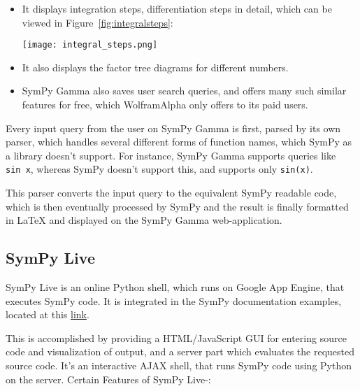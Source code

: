 \begin{itemize}
\item
  It displays integration steps, differentiation steps in detail, which
  can be viewed in Figure~\ref{fig:integralsteps}:\par
\begin{minipage}{\textwidth}
    \centering
    \texttt{[image: integral\_steps.png]}
    \label{fig:integralsteps}
\end{minipage}
\item
  It also displays the factor tree diagrams for different numbers.
\item
  SymPy Gamma also saves user search queries, and offers many such
  similar features for free, which Wolfram\textbar{}Alpha only offers
  to its paid users.
\end{itemize}
Every input query from the user on SymPy Gamma is first, parsed by its
own parser, which handles several different forms of function names,
which SymPy as a library doesn't support. For instance, SymPy Gamma
supports queries like \texttt{sin\ x}, whereas SymPy doesn't support
this, and supports only \verb|sin(x)|.

This parser converts the input query to the equivalent SymPy readable
code, which is then eventually processed by SymPy and the result is
finally formatted in LaTeX and displayed on the SymPy Gamma web-application.

\subsection{SymPy Live}\label{sympy-live}

SymPy Live is an online Python shell, which runs on Google
App Engine, that executes SymPy code. It is integrated in the SymPy
documentation examples, located at this \href{http://docs.sympy.org/latest/index.html}{link}.

This is accomplished by providing a HTML/JavaScript GUI for entering
source code and visualization of output, and a server part which
evaluates the requested source code. It's an interactive AJAX shell,
that runs SymPy code using Python on the server.
\newline
Certain Features of SymPy Live-:

